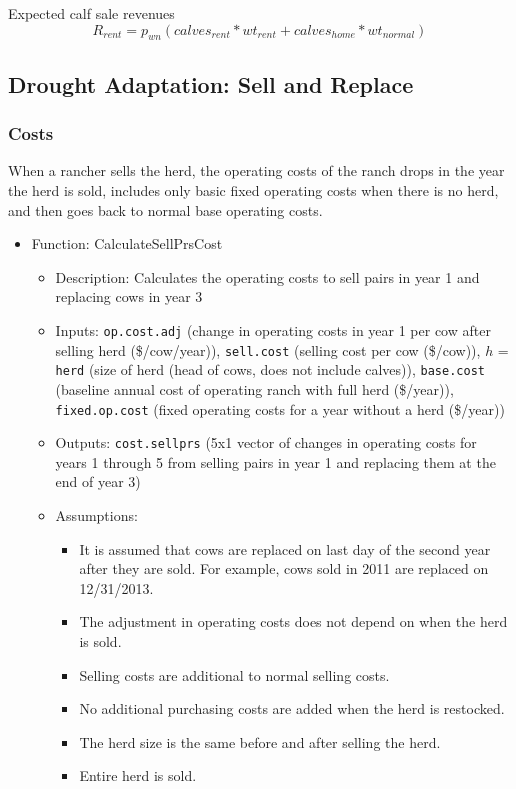 \documentclass[11pt]{article}
\begin{document}
Expected calf sale revenues
\begin{equation}
R_{rent} = p_{wn} ( calves_{rent} * wt_{rent} + calves_{home} * wt_{normal})
\end{equation} 

\subsection{Drought Adaptation: Sell and Replace}

\subsubsection{Costs}
When a rancher sells the herd, the operating costs of the ranch drops in the year the herd is sold, includes only basic fixed operating costs when there is no herd, and then goes back to normal base operating costs.

\begin{itemize}
\item Function: CalculateSellPrsCost
	\begin{itemize}
	\item Description: Calculates the operating costs to sell pairs in year 1 and replacing cows in year 3
	\item Inputs: \verb!op.cost.adj! (change in operating costs in year 1 per cow after selling herd (\$/cow/year)), \verb!sell.cost! (selling cost per cow (\$/cow)), $h$ = \verb!herd! (size of herd (head of cows, does not include calves)), \verb!base.cost! (baseline annual cost of operating ranch with full herd (\$/year)), \verb!fixed.op.cost! (fixed operating costs for a year without a herd (\$/year))
	\item Outputs: \verb!cost.sellprs! (5x1 vector of changes in operating costs for years 1 through 5 from selling pairs in year 1 and replacing them at the end of year 3)
  	\item Assumptions: 
  		\begin{itemize}
  		\item It is assumed that cows are replaced on last day of the second year after they are sold. For example, cows sold in 2011 are replaced on 12/31/2013. 
  		\item The adjustment in operating costs does not depend on when the herd is sold. 
  		\item Selling costs are additional to normal selling costs. 
  		\item No additional purchasing costs are added when the herd is restocked.
  		\item The herd size is the same before and after selling the herd.
  		\item Entire herd is sold.
  		\end{itemize}
	\end{itemize}
\end{itemize}
\end{document}

